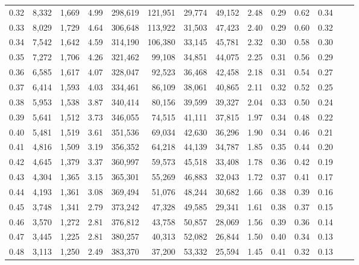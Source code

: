 \begin{tabular}{rrrrrrrrrrrrrr}
0.32 &   8,332 &  1,669 &    4.99 &  298,619 &  121,951 &  29,774 &  49,152 &  2.48 &  0.29 &  0.62 &      0.34 \\
0.33 &   8,029 &  1,729 &    4.64 &  306,648 &  113,922 &  31,503 &  47,423 &  2.40 &  0.29 &  0.60 &      0.32 \\
0.34 &   7,542 &  1,642 &    4.59 &  314,190 &  106,380 &  33,145 &  45,781 &  2.32 &  0.30 &  0.58 &      0.30 \\
0.35 &   7,272 &  1,706 &    4.26 &  321,462 &   99,108 &  34,851 &  44,075 &  2.25 &  0.31 &  0.56 &      0.29 \\
0.36 &   6,585 &  1,617 &    4.07 &  328,047 &   92,523 &  36,468 &  42,458 &  2.18 &  0.31 &  0.54 &      0.27 \\
0.37 &   6,414 &  1,593 &    4.03 &  334,461 &   86,109 &  38,061 &  40,865 &  2.11 &  0.32 &  0.52 &      0.25 \\
0.38 &   5,953 &  1,538 &    3.87 &  340,414 &   80,156 &  39,599 &  39,327 &  2.04 &  0.33 &  0.50 &      0.24 \\
0.39 &   5,641 &  1,512 &    3.73 &  346,055 &   74,515 &  41,111 &  37,815 &  1.97 &  0.34 &  0.48 &      0.22 \\
0.40 &   5,481 &  1,519 &    3.61 &  351,536 &   69,034 &  42,630 &  36,296 &  1.90 &  0.34 &  0.46 &      0.21 \\
0.41 &   4,816 &  1,509 &    3.19 &  356,352 &   64,218 &  44,139 &  34,787 &  1.85 &  0.35 &  0.44 &      0.20 \\
0.42 &   4,645 &  1,379 &    3.37 &  360,997 &   59,573 &  45,518 &  33,408 &  1.78 &  0.36 &  0.42 &      0.19 \\
0.43 &   4,304 &  1,365 &    3.15 &  365,301 &   55,269 &  46,883 &  32,043 &  1.72 &  0.37 &  0.41 &      0.17 \\
0.44 &   4,193 &  1,361 &    3.08 &  369,494 &   51,076 &  48,244 &  30,682 &  1.66 &  0.38 &  0.39 &      0.16 \\
0.45 &   3,748 &  1,341 &    2.79 &  373,242 &   47,328 &  49,585 &  29,341 &  1.61 &  0.38 &  0.37 &      0.15 \\
0.46 &   3,570 &  1,272 &    2.81 &  376,812 &   43,758 &  50,857 &  28,069 &  1.56 &  0.39 &  0.36 &      0.14 \\
0.47 &   3,445 &  1,225 &    2.81 &  380,257 &   40,313 &  52,082 &  26,844 &  1.50 &  0.40 &  0.34 &      0.13 \\
0.48 &   3,113 &  1,250 &    2.49 &  383,370 &   37,200 &  53,332 &  25,594 &  1.45 &  0.41 &  0.32 &      0.13 \\

\end{tabular}
